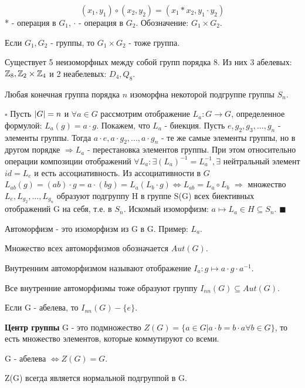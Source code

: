 \documentclass[../main.tex]{subfiles}
\begin{document}
$$(x_1, y_1) \circ (x_2, y_2) = (x_1 * x_2, y_1 \cdot y_2)$$
* - операция в $G_1$, $\cdot$ - операция в $G_2$.
Обозначение: $G_1\times G_2$.

\void
{} Если $G_1, G_2$ - группы, то $G_1\times G_2$ - тоже группа.

\void
{} Существует 5 неизоморфных между собой групп порядка 8. Из них 3
абелевых: $\mathbb{Z}_8, \mathbb{Z}_2\times\mathbb{Z}_4$ и 2 неабелевых: $D_4, Q_8$.

\void
{}

Любая конечная группа порядка $n$ изоморфна некоторой подгруппе группы $S_n$.

\void
$\square$ Пусть $\vert G\vert = n$ и $\forall a\in G$ рассмотрим отображение
$L_a: G\rightarrow G$, определенное формулой: $L_a(g) = a\cdot g$. Покажем, что
$L_a$ - биекция. Пусть $e, g_2, g_3,...,g_n$ - элементы группы. Тогда
$a\cdot e, a\cdot g_2,...,a\cdot g_n$ - те же самые элементы группы, но в
другом порядке $\Longrightarrow L_a$ - перестановка элементов группы.
При этом относительно операции композиции отображений $\forall L_a: \exists (L_a)^{-1} =
L_a^{-1}, \exists$ нейтральный элемент $id = L_e$ и есть ассоциативность. Из ассоциативности
в $G$ $L_{ab}(g) = (ab)\cdot g = a\cdot (bg) = L_a(L_b\cdot g) \Leftrightarrow L_{ab} = L_a\circ L_b$
$\Rightarrow$ множество $L_e, L_{g_2},...,L_{g_n}$ образуют подгруппу H в группе S(G) всех
биективных отображений G на себя, т.е. в $S_n$. Искомый изоморфизм:
$a \mapsto L_a\in H\subseteq S_n$. $\blacksquare$ 

\void{} Автоморфизм - это изоморфизм из G в G. Пример: $L_a$.

\void{} Множество всех автоморфизмов обозначается $Aut(G)$.

\void{} Внутренним автоморфизмом называют отображение $I_a: g\mapsto a\cdot g\cdot a^{-1}$.

\void{} Все внутренние автоморфизмы тоже образуют группу
$I_{nn}(G)\subseteq Aut(G)$.

\void{} Если G - абелева, то $I_{nn}(G) - \{e\}$.

\void{} \textbf{Центр группы} G - это подмножество $Z(G) = \{a\in G\vert a\cdot b = b\cdot a \forall b\in G\}$, то
есть множество элементов, которые коммутируют со всеми.

\void{} G - абелева $\Longleftrightarrow Z(G) = G$.

\void{} Z(G) всегда является нормальной подгруппой в G.
\end{document}
